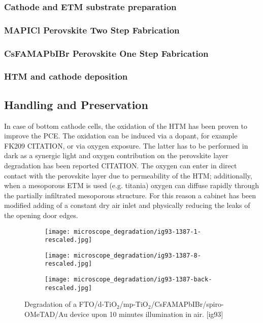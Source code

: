 		\subsubsection{Cathode and ETM substrate preparation}
	
		\subsubsection{MAPICl Perovskite Two Step Fabrication}
		
		\subsubsection{CsFAMAPbIBr Perovskite One Step Fabrication}
		
		\subsubsection{HTM and cathode deposition}

	\subsection{Handling and Preservation}
		In case of bottom cathode cells, the oxidation of the HTM has been proven to improve the PCE. The oxidation can be induced via a dopant, for example FK209 CITATION, or via oxygen exposure. The latter has to be performed in dark as a synergic light and oxygen contribution on the perovskite layer degradation has been reported CITATION. The oxygen can enter in direct contact with the perovskite layer due to permeability of the HTM; additionally, when a mesoporous ETM is used (e.g. titania) oxygen can diffuse rapidly through the partially infiltrated mesoporous structure. For this reason a cabinet has been modified adding of a constant dry air inlet and physically reducing the leaks of the opening door edges.
				
		\begin{figure}%
			\centering
			\begin{subfigure}[b]{0.45\textwidth}
				\texttt{[image: microscope\_degradation/ig93-1387-1-rescaled.jpg]}
				\label{fig:microscope_degradation-start}
			\end{subfigure}
			\qquad
			\begin{subfigure}[b]{0.45\textwidth}
				\texttt{[image: microscope\_degradation/ig93-1387-8-rescaled.jpg]}
				\label{fig:microscope_degradation-end_front}
			\end{subfigure}
			\bigskip
			
			\begin{subfigure}[b]{0.45\textwidth}
				\texttt{[image: microscope\_degradation/ig93-1387-back-rescaled.jpg]}
				\label{fig:microscope_degradation-end_back}
			\end{subfigure}
			\caption{Degradation of a FTO/d-TiO$_2$/mp-TiO$_2$/CsFAMAPbIBr/spiro-OMeTAD/Au device upon 10 minutes illumination in air. [ig93]}\label{fig:microscope_degradation}
		\end{figure}
	
